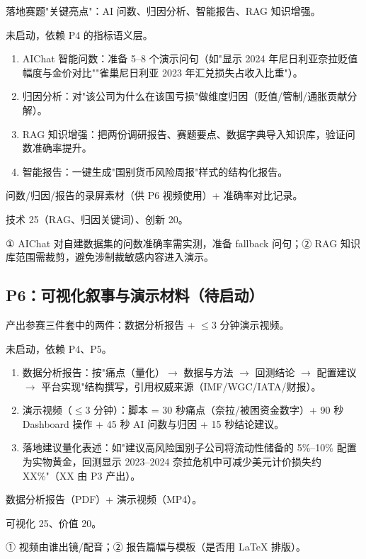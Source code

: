 \documentclass[UTF8,12pt]{ctexart}
\begin{document}
\begin{description}[style=nextline]
\item[目标] 落地赛题"关键亮点"：AI 问数、归因分析、智能报告、RAG 知识增强。
\item[现状] 未启动，依赖 P4 的指标语义层。
\item[具体动作]
\begin{enumerate}
\item AIChat 智能问数：准备 5--8 个演示问句（如"显示 2024 年尼日利亚奈拉贬值幅度与金价对比""雀巢尼日利亚 2023 年汇兑损失占收入比重"）。
\item 归因分析：对"该公司为什么在该国亏损"做维度归因（贬值/管制/通胀贡献分解）。
\item RAG 知识增强：把两份调研报告、赛题要点、数据字典导入知识库，验证问数准确率提升。
\item 智能报告：一键生成"国别货币风险周报"样式的结构化报告。
\end{enumerate}
\item[产出物] 问数/归因/报告的录屏素材（供 P6 视频使用）+ 准确率对比记录。
\item[对应评分项] 技术 25（RAG、归因关键词）、创新 20。
\item[风险与待决问题] ① AIChat 对自建数据集的问数准确率需实测，准备 fallback 问句；② RAG 知识库范围需裁剪，避免涉制裁敏感内容进入演示。
\end{description}

\subsection{P6：可视化叙事与演示材料（待启动）}

\begin{description}[style=nextline]
\item[目标] 产出参赛三件套中的两件：数据分析报告 + $\le$3 分钟演示视频。
\item[现状] 未启动，依赖 P4、P5。
\item[具体动作]
\begin{enumerate}
\item 数据分析报告：按"痛点（量化）$\to$ 数据与方法 $\to$ 回测结论 $\to$ 配置建议 $\to$ 平台实现"结构撰写，引用权威来源（IMF/WGC/IATA/财报）。
\item 演示视频（$\le$3 分钟）：脚本 = 30 秒痛点（奈拉/被困资金数字）+ 90 秒 Dashboard 操作 + 45 秒 AI 问数与归因 + 15 秒结论建议。
\item 落地建议量化表述：如"建议高风险国别子公司将流动性储备的 5\%--10\% 配置为实物黄金，回测显示 2023--2024 奈拉危机中可减少美元计价损失约 XX\%"（XX 由 P3 产出）。
\end{enumerate}
\item[产出物] 数据分析报告（PDF）+ 演示视频（MP4）。
\item[对应评分项] 可视化 25、价值 20。
\item[风险与待决问题] ① 视频由谁出镜/配音；② 报告篇幅与模板（是否用 LaTeX 排版）。
\end{description}
\end{document}
